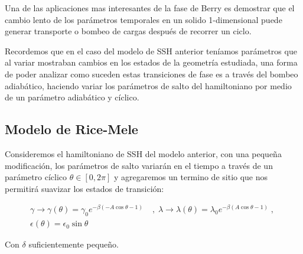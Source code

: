 Una de las aplicaciones mas interesantes de la fase de Berry es demostrar que el cambio lento de los parámetros temporales en un solido 1-dimensional puede generar transporte o bombeo de cargas después de recorrer un ciclo.

Recordemos que en el caso del modelo de SSH anterior teníamos parámetros que al variar mostraban cambios en los estados de la geometría estudiada, una forma de poder analizar como suceden estas transiciones de fase es a través del bombeo adiabático, haciendo variar los parámetros de salto del hamiltoniano por medio de un parámetro adiabático y cíclico.

\subsection{Modelo de Rice-Mele}

Consideremos el hamiltoniano de SSH del modelo anterior, con una pequeña modificación, los parámetros de salto variarán en el tiempo a través de un parámetro cíclico $\theta \in \left[ 0 , 2\pi\right]$ y agregaremos un termino de sitio que nos permitirá suavizar los estados de transición:


\begin{align}
    \nonumber\gamma \rightarrow \gamma (\theta) = \gamma_0 e^{\displaystyle-\beta(-A \cos \theta - 1)} \; &,\;  \lambda \rightarrow \lambda(\theta) = \lambda_0 e^{\displaystyle-\beta( A \cos \theta - 1 )} \;,\; \\  \epsilon(\theta) = \epsilon_0 \sin \theta
\end{align}

Con $\delta$ suficientemente pequeño.

